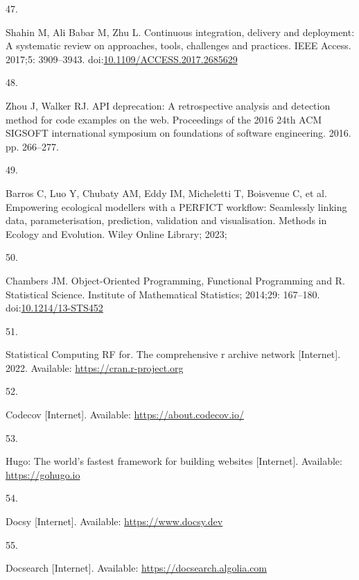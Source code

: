 \documentclass[
]{article}
\newlength{\cslhangindent}
\newlength{\csllabelwidth}
\newlength{\cslentryspacingunit} %
\newenvironment{CSLReferences}[2] %
 {%
  \setlength{\parindent}{0pt}
  \ifodd #1
  \let\oldpar\par
  \def\par{\hangindent=\cslhangindent\oldpar}
  \fi
  \setlength{\parskip}{#2\cslentryspacingunit}
 }%
 {}
\newcommand{\CSLLeftMargin}[1]{\parbox[t]{\csllabelwidth}{#1}}
\newcommand{\CSLRightInline}[1]{\parbox[t]{\linewidth - \csllabelwidth}{#1}\break}
\begin{document}
\begin{CSLReferences}{0}{0}
\leavevmode{}%
\CSLLeftMargin{47. }%
\CSLRightInline{Shahin M, Ali Babar M, Zhu L. Continuous integration, delivery and deployment: A systematic review on approaches, tools, challenges and practices. IEEE Access. 2017;5: 3909--3943. doi:\href{https://doi.org/10.1109/ACCESS.2017.2685629}{10.1109/ACCESS.2017.2685629}}

\leavevmode{}%
\CSLLeftMargin{48. }%
\CSLRightInline{Zhou J, Walker RJ. API deprecation: A retrospective analysis and detection method for code examples on the web. Proceedings of the 2016 24th ACM SIGSOFT international symposium on foundations of software engineering. 2016. pp. 266--277. }

\leavevmode{}%
\CSLLeftMargin{49. }%
\CSLRightInline{Barros C, Luo Y, Chubaty AM, Eddy IM, Micheletti T, Boisvenue C, et al. Empowering ecological modellers with a PERFICT workflow: Seamlessly linking data, parameterisation, prediction, validation and visualisation. Methods in Ecology and Evolution. Wiley Online Library; 2023; }

\leavevmode{}%
\CSLLeftMargin{50. }%
\CSLRightInline{Chambers JM. {Object-Oriented Programming, Functional Programming and R}. Statistical Science. Institute of Mathematical Statistics; 2014;29: 167--180. doi:\href{https://doi.org/10.1214/13-STS452}{10.1214/13-STS452}}

\leavevmode{}%
\CSLLeftMargin{51. }%
\CSLRightInline{Statistical Computing RF for. The comprehensive r archive network {[}Internet{]}. 2022. Available: \url{https://cran.r-project.org}}

\leavevmode{}%
\CSLLeftMargin{52. }%
\CSLRightInline{Codecov {[}Internet{]}. Available: \url{https://about.codecov.io/}}

\leavevmode{}%
\CSLLeftMargin{53. }%
\CSLRightInline{Hugo: The world's fastest framework for building websites {[}Internet{]}. Available: \url{https://gohugo.io}}

\leavevmode{}%
\CSLLeftMargin{54. }%
\CSLRightInline{Docsy {[}Internet{]}. Available: \url{https://www.docsy.dev}}

\leavevmode{}%
\CSLLeftMargin{55. }%
\CSLRightInline{Docsearch {[}Internet{]}. Available: \url{https://docsearch.algolia.com}}


\end{CSLReferences}
\end{document}
